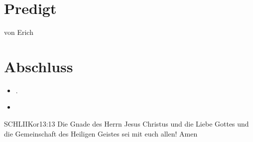 \documentclass[fontsize=14pt]{mybib}
\newcommand{\Name}{Erich}
\begin{document}
\section{Predigt}
    von \Name{}
\section{Abschluss}
\begin{itemize}
    \item [] .
    \item [] 
\end{itemize}
\begin{bibelbox}{SCHL}{IIKor}{13:13}
    Die Gnade des Herrn Jesus Christus und die Liebe Gottes und die Gemeinschaft des Heiligen Geistes sei mit euch allen! Amen
\end{bibelbox}
\end{document}
